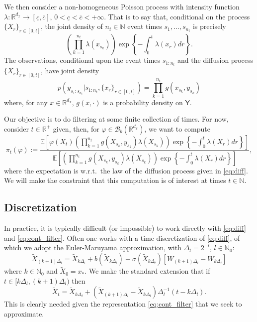 \documentclass[english]{article}
\begin{document}
We then consider a non-homogeneous Poisson process with intensity function $\lambda:\mathbb{R}^{d_x}\rightarrow[\underline{c},\overline{c}]$, $0<\underline{c}<\overline{c}<+\infty$. That is to say that, conditional on the process $\{X_r\}_{r\in[0,t]}$, the joint density of $n_t\in\mathbb{N}$ event times $s_1,\dots,s_{n_t}$ is precisely
$$
\left(\prod_{k=1}^{n_t} \lambda(x_{s_k})\right)\exp\left\{-\int_{0}^t \lambda(x_r)dr\right\}.
$$
The observations, conditional upon the event times $s_{1:n_t}$ and the diffusion process  $\{X_r\}_{r\in[0,t]}$, have joint density
$$
p(y_{s_1:s_{n_t}}|s_{1:n_t},\{x_r\}_{r\in[0,t]}) = \prod_{k=1}^{n_t} g(x_{s_k},y_{s_k})
$$
where, for any $x\in\mathbb{R}^{d_x}$, $g(x,\cdot)$ is a probability density on $\mathsf{Y}$.

Our objective is to do filtering at some finite collection of times. For now, consider $t\in\mathbb{R}^+$ given, then, for $\varphi\in\mathcal{B}_b(\mathbb{R}^{d_x})$, we want to compute
\begin{equation}\label{eq:cont_filter}
\pi_t(\varphi) := \frac{
\mathbb{E}\left[\varphi(X_t)\left(\prod_{k=1}^{n_t} g(X_{s_k},y_{s_k})\lambda(X_{s_k})\right)
\exp\left\{-\int_{0}^t \lambda(X_r)dr\right\}
\right]
}{\mathbb{E}\left[\left(\prod_{k=1}^{n_t} g(X_{s_k},y_{s_k})\lambda(X_{s_k})\right)
\exp\left\{-\int_{0}^t \lambda(X_r)dr\right\}
\right]},
\end{equation}
where the expectation is w.r.t.~the law of the diffusion process given in \eqref{eq:diff}. We will make the constraint that this computation is of interest at times $t\in\mathbb{N}$.

\subsection{Discretization}

In practice, it is typically difficult (or impossible) to work directly with \eqref{eq:diff} and \eqref{eq:cont_filter}. Often one works with a time discretization of \eqref{eq:diff}, of which we adopt the Euler-Maruyama approximation, with $\Delta_l=2^{-l}$, $l\in\mathbb{N}_0$:
\begin{equation}\label{eq:euler}
\widetilde{X}_{(k+1)\Delta_l} = \widetilde{X}_{k\Delta_l} + b(\widetilde{X}_{k\Delta_l}) + \sigma(\widetilde{X}_{k\Delta_l})[W_{(k+1)\Delta_l}-W_{k\Delta_l}]
\end{equation}
where $k\in\mathbb{N}_0$ and $\widetilde{X}_0=x_{*}$. We make the standard extension that if $t\in[k\Delta_l,(k+1)\Delta_l)$ then
\begin{equation}\label{eq:inbetween_euler}
\widetilde{X}_{t}=\widetilde{X}_{k\Delta_l}+(\widetilde{X}_{(k+1)\Delta_l}-\widetilde{X}_{k\Delta_l})\Delta_l^{-1}(t-k\Delta_l).
\end{equation}
This is clearly needed given the representation \eqref{eq:cont_filter} that we seek to approximate.
\end{document}
